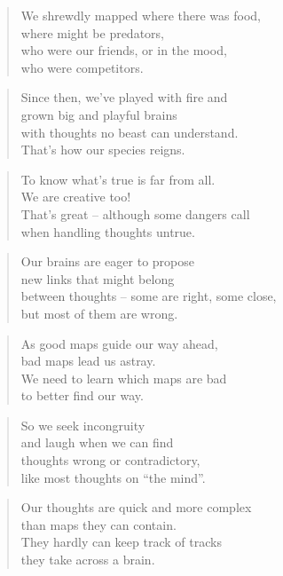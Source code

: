 \documentclass[10pt,a4paper]{article}
\begin{document}
\begin{multicols}{2}
\begin{verse}
We shrewdly mapped where there was food,\\
where might be predators,\\
who were our friends, or in the mood,\\
who were competitors.
\end{verse}

\begin{verse}
Since then, we’ve played with fire and\\
grown big and playful brains\\
with thoughts no beast can understand.\\
That’s how our species reigns.
\end{verse}

\begin{verse}
To know what’s true is far from all.\\
We are creative too!\\
That’s great – although some dangers call\\
when handling thoughts untrue.
\end{verse}

\begin{verse}
Our brains are eager to propose\\
new links that might belong\\
between thoughts – some are right, some close,\\
but most of them are wrong.
\end{verse}

\begin{verse}
As good maps guide our way ahead,\\
bad maps lead us astray.\\
We need to learn which maps are bad\\
to better find our way.
\end{verse}

\begin{verse}
So we seek incongruity\\
and laugh when we can find\\
thoughts wrong or contradictory,\\
like most thoughts on “the mind”.
\end{verse}

\begin{verse}
Our thoughts are quick and more complex\\
than maps they can contain.\\
They hardly can keep track of tracks\\
they take across a brain.
\end{verse}


\end{multicols}
\end{document}
